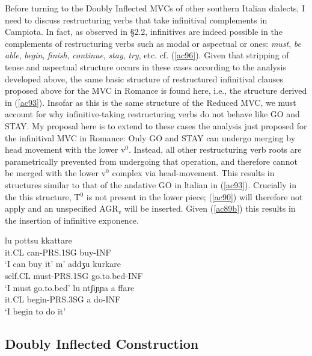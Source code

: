 \documentclass[output=paper]{langscibook}
\begin{document}
Before turning to the Doubly Inflected MVCs of other southern Italian dialects, I need to discuss restructuring verbs that take infinitival complements in Campiota. In fact, as observed in §2.2, infinitives are indeed possible in the complements of restructuring verbs such as modal or aspectual or ones: \textit{must},\textit{ be  able},  \textit{begin},  \textit{finish},  \textit{continue},  \textit{stay},  \textit{try}, etc. cf. (\ref{ac96}). Given that stripping of tense and aspectual structure occurs in these cases according to the analysis developed above, the same basic structure of restructured infinitival clauses proposed above for the MVC in Romance is found here, i.e., the structure derived in (\ref{ac93}). Insofar as this is the same structure of the Reduced MVC, we must account for why infinitive-taking restructuring verbs do not behave like GO and STAY. My proposal here is to extend to these cases the analysis just proposed for the infinitival MVC in Romance: Only GO and STAY can undergo merging  by  head  movement  with  the  lower  v$^0$.  Instead, all other restructuring verb roots are parametrically prevented from undergoing that operation, and therefore cannot be merged with the lower v$^0$ complex via head-movement. This results in structures similar to that of the andative GO in ltalian in (\ref{ac93}). Crucially in the this structure, T$^0$ is not present in the lower piece; (\ref{ac90}) will therefore not apply and an unspecified AGR$_v$ will be inserted.  Given (\ref{ac89b}) this results in the insertion of infinitive exponence.

\ea \label{ac96}
    \ea \gll lu      pottsu     kkattare\\
    it.CL can-PRS.1SG buy-INF\\
    \glt `I can buy it'
    \ex \gll m’    addʒu      kurkare\\
    self.CL  must-PRS.1SG   go.to.bed-INF \\
    \glt `I must go.to.bed'
    \ex \gll lu ntʃiɲɲa       a  ffare\\
    it.CL begin-PRS.3SG a  do-INF \\
    \glt `I begin to do it'
    \z
\z

\subsection{Doubly Inflected Construction}
\end{document}
